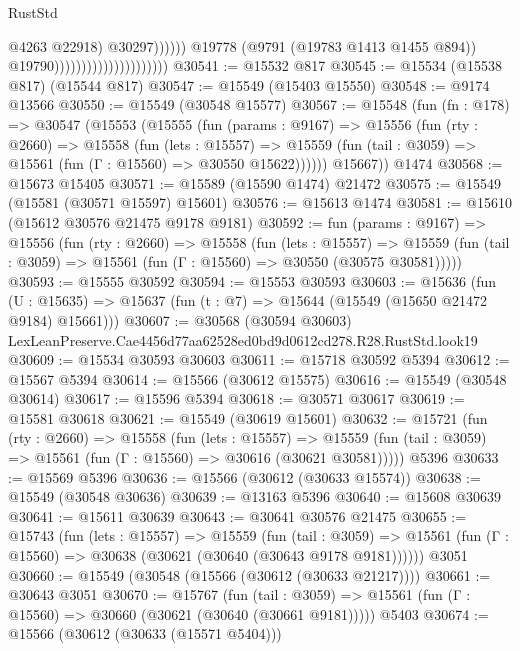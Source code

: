 \begin{lexlean}{RustStd}
\begin{coremodule}
                                                            @4263
                                                            @22918)
                                                          @30297))))))
                                              @19778
                                              (@9791 (@19783 @1413 @1455 @894))
                                              @19790)))))))))))))))))))))
@30541 := @15532 @817
@30545 := @15534 (@15538 @817) (@15544 @817)
@30547 := @15549 (@15403 @15550)
@30548 := @9174 @13566
@30550 := @15549 (@30548 @15577)
@30567 := @15548
    (fun (fn : @178) =>
    @30547
      (@15553
        (@15555
          (fun (params : @9167) =>
          @15556
            (fun (rty : @2660) =>
            @15558
              (fun (lets : @15557) =>
              @15559 (fun (tail : @3059) => @15561 (fun (Γ : @15560) => @30550 @15622))))))
        @15667))
    @1474
@30568 := @15673 @15405
@30571 := @15589 (@15590 @1474) @21472
@30575 := @15549 (@15581 (@30571 @15597) @15601)
@30576 := @15613 @1474
@30581 := @15610 (@15612 @30576 @21475 @9178 @9181)
@30592 := fun (params : @9167) =>
  @15556
    (fun (rty : @2660) =>
    @15558
      (fun (lets : @15557) =>
      @15559 (fun (tail : @3059) => @15561 (fun (Γ : @15560) => @30550 (@30575 @30581)))))
@30593 := @15555 @30592
@30594 := @15553 @30593
@30603 := @15636
    (fun (U : @15635) => @15637 (fun (t : @7) => @15644 (@15549 (@15650 @21472 @9184) @15661)))
@30607 := @30568
    (@30594 @30603)
    LexLeanPreserve.Cae4456d77aa62528ed0bd9d0612cd278.R28.RustStd.look19
@30609 := @15534 @30593 @30603
@30611 := @15718 @30592 @5394
@30612 := @15567 @5394
@30614 := @15566 (@30612 @15575)
@30616 := @15549 (@30548 @30614)
@30617 := @15596 @5394
@30618 := @30571 @30617
@30619 := @15581 @30618
@30621 := @15549 (@30619 @15601)
@30632 := @15721
    (fun (rty : @2660) =>
    @15558
      (fun (lets : @15557) =>
      @15559 (fun (tail : @3059) => @15561 (fun (Γ : @15560) => @30616 (@30621 @30581)))))
    @5396
@30633 := @15569 @5396
@30636 := @15566 (@30612 (@30633 @15574))
@30638 := @15549 (@30548 @30636)
@30639 := @13163 @5396
@30640 := @15608 @30639
@30641 := @15611 @30639
@30643 := @30641 @30576 @21475
@30655 := @15743
    (fun (lets : @15557) =>
    @15559
      (fun (tail : @3059) =>
      @15561 (fun (Γ : @15560) => @30638 (@30621 (@30640 (@30643 @9178 @9181))))))
    @3051
@30660 := @15549 (@30548 (@15566 (@30612 (@30633 @21217))))
@30661 := @30643 @3051
@30670 := @15767
    (fun (tail : @3059) => @15561 (fun (Γ : @15560) => @30660 (@30621 (@30640 (@30661 @9181)))))
    @5403
@30674 := @15566 (@30612 (@30633 (@15571 @5404)))

\end{coremodule}
\end{lexlean}

